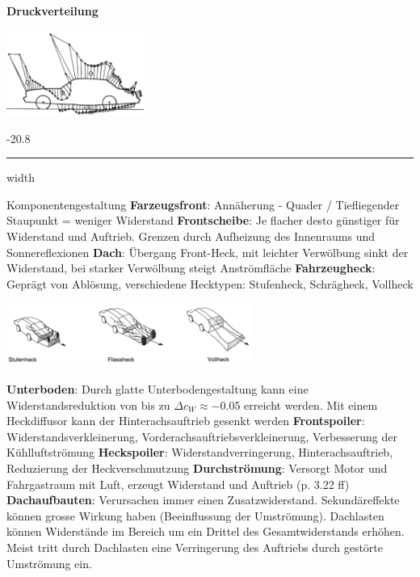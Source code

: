 \documentclass[8pt, landscape, fleqn]{scrartcl}
\makeatletter
\renewcommand{\subsubsection}{\@startsection{subsubsection}{1}{0mm}%
{-2\baselineskip}{0.8\baselineskip}%
{\hrule depth 0.2pt width\columnwidth\vspace*{1.2em}\normalsize\bfseries\rmfamily}}
\makeatother
\begin{document}
\begin{multicols*}{3}
\textbf{Druckverteilung}

\begin{center}
        \includegraphics[width=4.5cm]{Druckverteilung_Personenwagen.png}
\end{center}


\subsubsection{Komponentengestaltung}
\textbf{Farzeugsfront}: Annäherung - Quader / Tiefliegender Staupunkt = weniger Widerstand \newline \newline
\textbf{Frontscheibe}: Je flacher desto günstiger für Widerstand und Auftrieb. Grenzen durch Aufheizung des Innenraums und Sonnereflexionen \newline \newline
\textbf{Dach}: Übergang Front-Heck, mit leichter Verwölbung sinkt der Widerstand, bei starker Verwölbung steigt Anströmfläche \newline \newline
\textbf{Fahrzeugheck}: Geprägt von Ablösung, verschiedene Hecktypen: Stufenheck, Schrägheck, Vollheck

\begin{center}
    \includegraphics[width=8cm]{Fahrzeugheck_Personenwagen.png}
\end{center}

\textbf{Unterboden}: Durch glatte Unterbodengestaltung kann eine Widerstandsreduktion von bis zu $\Delta c_W \approx -0.05$ erreicht werden. Mit einem Heckdiffusor kann der Hinterachsauftrieb gesenkt werden \newline \newline
\textbf{Frontspoiler}: Widerstandsverkleinerung, Vorderachsauftriebsverkleinerung, Verbesserung der Kühlluftströmung \newline \newline
\textbf{Heckspoiler}: Widerstandverringerung, Hinterachsauftrieb, Reduzierung der Heckverschmutzung \newline \newline
\textbf{Durchströmung}: Versorgt Motor und Fahrgastraum mit Luft, erzeugt Widerstand und Auftrieb (p. 3.22 ff) \newline \newline
\textbf{Dachaufbauten}: Verursachen immer einen Zusatzwiderstand. Sekundäreffekte können grosse Wirkung haben (Beeinflussung der Umströmung). Dachlasten können Widerstände im Bereich um ein Drittel des Gesamtwiderstands erhöhen. Meist tritt durch Dachlasten eine Verringerung des Auftriebs durch gestörte Umströmung ein.


\end{multicols*}
\end{document}
